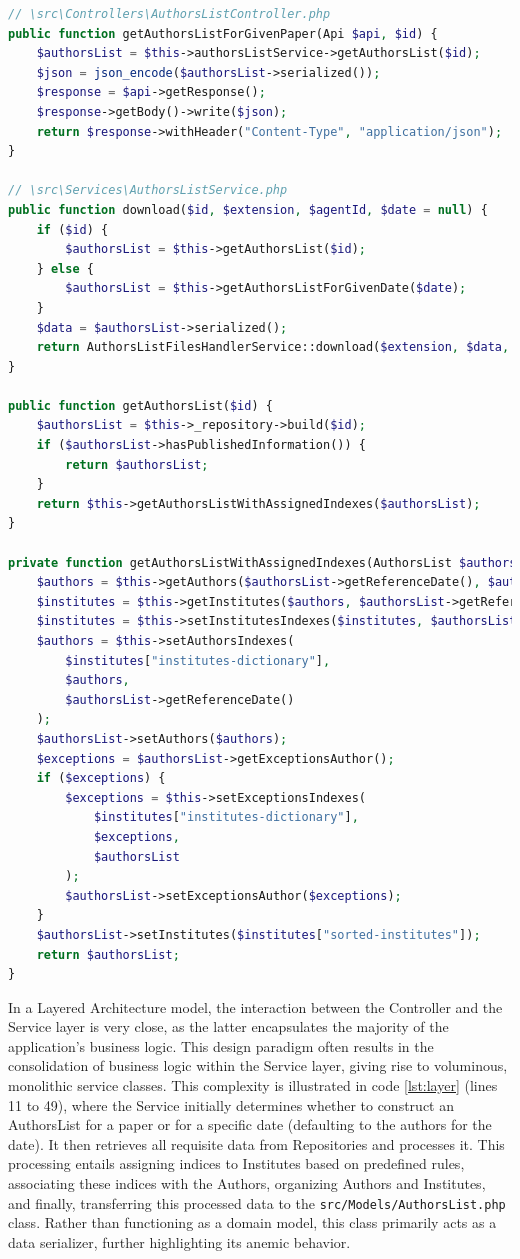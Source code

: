 \begin{lstlisting}[language=PHP, caption={Layered Architecture Implementation.}, label=lst:layer]
// \src\Controllers\AuthorsListController.php
public function getAuthorsListForGivenPaper(Api $api, $id) {
    $authorsList = $this->authorsListService->getAuthorsList($id);
    $json = json_encode($authorsList->serialized());
    $response = $api->getResponse();
    $response->getBody()->write($json);
    return $response->withHeader("Content-Type", "application/json");
}

// \src\Services\AuthorsListService.php
public function download($id, $extension, $agentId, $date = null) {
    if ($id) {
        $authorsList = $this->getAuthorsList($id);
    } else {
        $authorsList = $this->getAuthorsListForGivenDate($date);
    }
    $data = $authorsList->serialized();
    return AuthorsListFilesHandlerService::download($extension, $data, $agentId);
}

public function getAuthorsList($id) {
    $authorsList = $this->_repository->build($id);
    if ($authorsList->hasPublishedInformation()) {
        return $authorsList;
    }
    return $this->getAuthorsListWithAssignedIndexes($authorsList);
}

private function getAuthorsListWithAssignedIndexes(AuthorsList $authorsList): AuthorsList {
    $authors = $this->getAuthors($authorsList->getReferenceDate(), $authorsList->getId());
    $institutes = $this->getInstitutes($authors, $authorsList->getReferenceDate());
    $institutes = $this->setInstitutesIndexes($institutes, $authorsList->getReferenceDate());
    $authors = $this->setAuthorsIndexes(
        $institutes["institutes-dictionary"], 
        $authors, 
        $authorsList->getReferenceDate()
    );
    $authorsList->setAuthors($authors);
    $exceptions = $authorsList->getExceptionsAuthor();
    if ($exceptions) {
        $exceptions = $this->setExceptionsIndexes(
            $institutes["institutes-dictionary"], 
            $exceptions, 
            $authorsList
        );
        $authorsList->setExceptionsAuthor($exceptions);
    }
    $authorsList->setInstitutes($institutes["sorted-institutes"]);
    return $authorsList;
}
\end{lstlisting}

In a Layered Architecture model, the interaction between the Controller and the Service layer is very close, as the latter encapsulates the majority of the application's business logic. This design paradigm often results in the consolidation of business logic within the Service layer, giving rise to voluminous, monolithic service classes. This complexity is illustrated in code \ref{lst:layer} (lines 11 to 49), where the Service initially determines whether to construct an AuthorsList for a paper or for a specific date (defaulting to the authors for the date). It then retrieves all requisite data from Repositories and processes it. This processing entails assigning indices to Institutes based on predefined rules, associating these indices with the Authors, organizing Authors and Institutes, and finally, transferring this processed data to the \verb|src/Models/AuthorsList.php| class. Rather than functioning as a domain model, this class primarily acts as a data serializer, further highlighting its anemic behavior.

